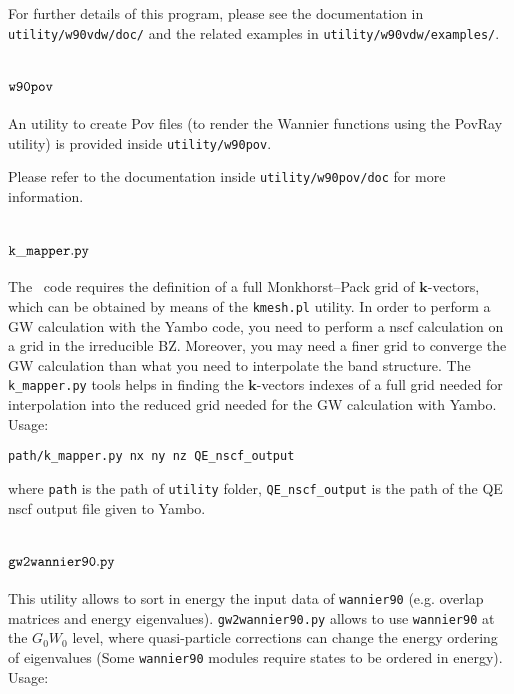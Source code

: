 For further details of this program, please see the documentation
in \verb|utility/w90vdw/doc/| and the related examples in
\verb|utility/w90vdw/examples/|.

\section{$\tt{w90pov}$}
\label{sec:w90pov}

An utility to create Pov files (to render the Wannier functions using
the PovRay utility) is provided inside \verb|utility/w90pov|.

Please refer to the documentation inside \verb|utility/w90pov/doc|
for more information.


\section{$\tt{k\_mapper.py}$}
\label{sec:k_mapper}
The \wannier\ code requires the definition of a full Monkhorst--Pack
grid of $\mathbf{k}$-vectors, which can be obtained by means of the \verb|kmesh.pl| utility.
In order to perform a GW calculation with the Yambo code, you need to perform a nscf calculation on a grid in the irreducible BZ. Moreover, you may need a finer grid to converge the GW calculation than what you need to interpolate the band structure. The \verb|k_mapper.py| tools helps in finding the $\mathbf{k}$-vectors indexes of a full grid needed for interpolation into the reduced grid needed for the GW calculation with Yambo. \newline \newline
Usage:\newline

\verb|path/k_mapper.py nx ny nz QE_nscf_output|\newline

where \verb|path| is the path of \verb|utility| folder,
\verb|QE_nscf_output| is the path of the QE nscf output file given to Yambo.
\section{$\tt{gw2wannier90.py}$}
This utility allows to sort in energy the input data of \verb|wannier90| (e.g. overlap matrices and energy eigenvalues). \verb|gw2wannier90.py| allows to use \verb|wannier90| at the $G_0W_0$ level, where quasi-particle corrections can change the energy ordering of eigenvalues (Some \verb|wannier90| modules require states to be ordered in energy).\newline \newline
Usage:

